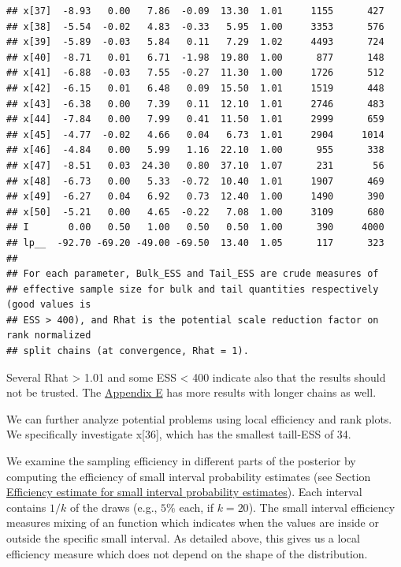 \documentclass[american,]{article}
\begin{document}
\begin{verbatim}
## x[37]  -8.93   0.00   7.86  -0.09  13.30  1.01     1155      427
## x[38]  -5.54  -0.02   4.83  -0.33   5.95  1.00     3353      576
## x[39]  -5.89  -0.03   5.84   0.11   7.29  1.02     4493      724
## x[40]  -8.71   0.01   6.71  -1.98  19.80  1.00      877      148
## x[41]  -6.88  -0.03   7.55  -0.27  11.30  1.00     1726      512
## x[42]  -6.15   0.01   6.48   0.09  15.50  1.01     1519      448
## x[43]  -6.38   0.00   7.39   0.11  12.10  1.01     2746      483
## x[44]  -7.84   0.00   7.99   0.41  11.50  1.01     2999      659
## x[45]  -4.77  -0.02   4.66   0.04   6.73  1.01     2904     1014
## x[46]  -4.84   0.00   5.99   1.16  22.10  1.00      955      338
## x[47]  -8.51   0.03  24.30   0.80  37.10  1.07      231       56
## x[48]  -6.73   0.00   5.33  -0.72  10.40  1.01     1907      469
## x[49]  -6.27   0.04   6.92   0.73  12.40  1.00     1490      390
## x[50]  -5.21   0.00   4.65  -0.22   7.08  1.00     3109      680
## I       0.00   0.50   1.00   0.50   0.50  1.00      390     4000
## lp__  -92.70 -69.20 -49.00 -69.50  13.40  1.05      117      323
## 
## For each parameter, Bulk_ESS and Tail_ESS are crude measures of 
## effective sample size for bulk and tail quantities respectively (good values is 
## ESS > 400), and Rhat is the potential scale reduction factor on rank normalized
## split chains (at convergence, Rhat = 1).
\end{verbatim}

Several Rhat \textgreater{} 1.01 and some ESS \textless{} 400 indicate
also that the results should not be trusted. The
\protect\hyperlink{AppendixE}{Appendix E} has more results with longer
chains as well.

We can further analyze potential problems using local efficiency and
rank plots. We specifically investigate x{[}36{]}, which has the
smallest taill-ESS of 34.

We examine the sampling efficiency in different parts of the posterior
by computing the efficiency of small interval probability estimates (see
Section \protect\hyperlink{small_interval_S_eff}{Efficiency estimate for
small interval probability estimates}). Each interval contains \(1/k\)
of the draws (e.g., \(5\%\) each, if \(k=20\)). The small interval
efficiency measures mixing of an function which indicates when the
values are inside or outside the specific small interval. As detailed
above, this gives us a local efficiency measure which does not depend on
the shape of the distribution.
\end{document}

